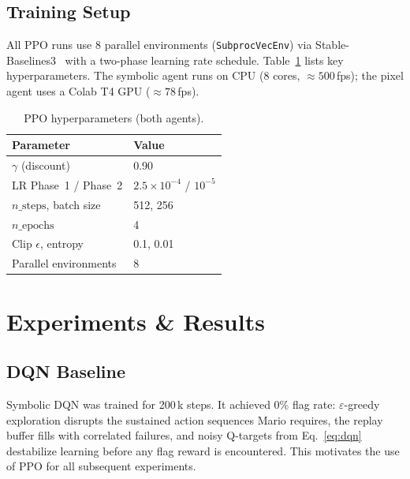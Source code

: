 \documentclass[10pt,a4paper,twocolumn]{article}
\begin{document}
\subsection{Training Setup}

All PPO runs use 8 parallel environments (\texttt{SubprocVecEnv}) via
Stable-Baselines3~\cite{raffin2021stable} with a two-phase learning rate
schedule. Table~\ref{tab:hyperparams} lists key hyperparameters.
The symbolic agent runs on CPU (8 cores, $\approx\!500$\,fps); the pixel
agent uses a Colab T4 GPU ($\approx\!78$\,fps).

\begin{table}[H]
\centering
\small
\caption{PPO hyperparameters (both agents).}
\label{tab:hyperparams}
\begin{tabular}{@{}ll@{}}
\toprule
\textbf{Parameter} & \textbf{Value} \\
\midrule
$\gamma$ (discount)       & 0.90 \\
LR Phase~1 / Phase~2      & $2.5\!\times\!10^{-4}$ / $10^{-5}$ \\
$n\_\mathrm{steps}$, batch size & 512, 256 \\
$n\_\mathrm{epochs}$      & 4 \\
Clip $\epsilon$, entropy  & 0.1, 0.01 \\
Parallel environments     & 8 \\
\bottomrule
\end{tabular}
\end{table}

\section{Experiments \& Results}

\subsection{DQN Baseline}

Symbolic DQN was trained for 200\,k steps.
It achieved 0\% flag rate: $\varepsilon$-greedy exploration disrupts the
sustained action sequences Mario requires, the replay buffer fills with
correlated failures, and noisy Q-targets from Eq.~\eqref{eq:dqn}
destabilize learning before any flag reward is encountered.
This motivates the use of PPO for all subsequent experiments.
\end{document}
